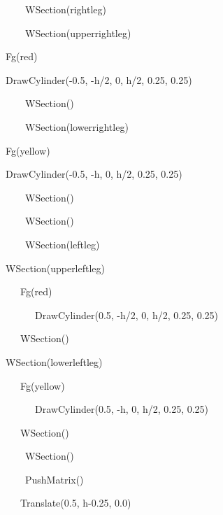 \documentclass[letterpaper]{article}
\begin{document}
{{\sffamily
\ \ \ \ \ \ WSection({\textquotedbl}rightleg{\textquotedbl})}

{\sffamily
\ \ \ \ \ \ WSection({\textquotedbl}upperrightleg{\textquotedbl})}

{\sffamily
\ \  Fg({\textquotedbl}red{\textquotedbl})}

{\sffamily
\ \  DrawCylinder(-0.5, -h/2, 0, h/2, 0.25, 0.25)}

{\sffamily
\ \ \ \ \ \ WSection()}

{\sffamily
\ \ \ \ \ \ WSection({\textquotedbl}lowerrightleg{\textquotedbl})}

{\sffamily
\ \  Fg({\textquotedbl}yellow{\textquotedbl})}

{\sffamily
\ \  DrawCylinder(-0.5, -h, 0, h/2, 0.25, 0.25)}

{\sffamily
\ \ \ \ \ \ WSection()}

{\sffamily
\ \ \ \ \ \ WSection()}

{\sffamily
\ \ \ \ \ \ WSection({\textquotedbl}leftleg{\textquotedbl})}

{\sffamily
\ \  WSection({\textquotedbl}upperleftleg{\textquotedbl})\ \ }

{\sffamily
\ \  \ \ \ Fg({\textquotedbl}red{\textquotedbl})}

{\sffamily
\ \ \ \ \  \ \ \ DrawCylinder(0.5, -h/2, 0, h/2, 0.25, 0.25)}

{\sffamily
\ \ \ \ \  WSection()}

{\sffamily
\ \  WSection({\textquotedbl}lowerleftleg{\textquotedbl})\ }

{\sffamily
\ \  \ \ \ Fg({\textquotedbl}yellow{\textquotedbl})}

{\sffamily
\ \ \ \ \  \ \ \ DrawCylinder(0.5, -h, 0, h/2, 0.25, 0.25)}

{\sffamily
\ \ \ \ \  WSection()}

{\sffamily
\ \ \ \ \ \ WSection()}

{\sffamily
\ \ \ \ \ \ PushMatrix()}

{\sffamily
\ \ \ \ \  Translate(0.5, h-0.25, 0.0)}

}
\end{document}
